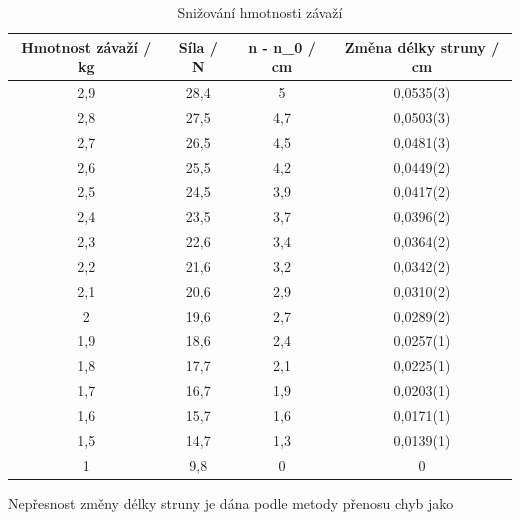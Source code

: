 \begin{table}[h]
\centering
\begin{tabular}{|c|c|c|c|}
\hline
Hmotnost závaží / kg & Síla / N & n - n\_0 / cm & Změna délky struny / cm \\ \hline
2,9                  & 28,4     & 5             & 0,0535(3)                  \\ \hline
2,8                  & 27,5     & 4,7           & 0,0503(3)                  \\ \hline
2,7                  & 26,5     & 4,5           & 0,0481(3)                  \\ \hline
2,6                  & 25,5     & 4,2           & 0,0449(2)                  \\ \hline
2,5                  & 24,5     & 3,9           & 0,0417(2)                  \\ \hline
2,4                  & 23,5     & 3,7           & 0,0396(2)                  \\ \hline
2,3                  & 22,6     & 3,4           & 0,0364(2)                  \\ \hline
2,2                  & 21,6     & 3,2           & 0,0342(2)                  \\ \hline
2,1                  & 20,6     & 2,9           & 0,0310(2)                  \\ \hline
2                    & 19,6     & 2,7           & 0,0289(2)                  \\ \hline
1,9                  & 18,6     & 2,4           & 0,0257(1)                  \\ \hline
1,8                  & 17,7     & 2,1           & 0,0225(1)                  \\ \hline
1,7                  & 16,7     & 1,9           & 0,0203(1)                  \\ \hline
1,6                  & 15,7     & 1,6           & 0,0171(1)                  \\ \hline
1,5                  & 14,7     & 1,3           & 0,0139(1)                  \\ \hline
1                    & 9,8      & 0             & 0                  \\ \hline
\end{tabular}
\caption{Snižování hmotnosti závaží}
\label{tab:snizovani-hmotnosti}
\end{table}

\newpage

Nepřesnost změny délky struny je dána podle metody přenosu chyb jako

